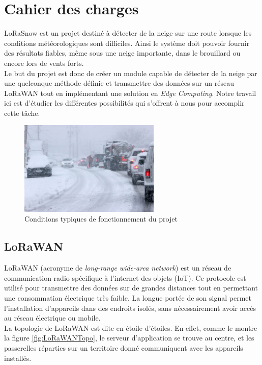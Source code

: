 \section{Cahier des charges}

LoRaSnow est un projet destiné à détecter de la neige sur une route lorsque les conditions 
météorologiques sont difficiles. Ainsi le système doit pouvoir fournir des résultats fiables,
même sous une neige importante, dans le brouillard ou encore lors de vents forts.\\
Le but du projet est donc de créer un module capable de détecter de la neige par une quelconque méthode 
définie et transmettre des données sur un réseau LoRaWAN tout en implémentant une solution en 
\emph{Edge Computing}. Notre travail ici est d'étudier les différentes possibilités qui s'offrent à nous 
pour accomplir cette tâche.

\begin{figure}[H]
    \centering
    \includegraphics[width=0.6\textwidth]{Images/Illustration/ConditionDifficiles.jpg}
    \caption[]{Conditions typiques de fonctionnement du projet\footnotemark[1]}
    \label{fig:ConditionDifficiles}
\end{figure}


\newpage

\subsection{LoRaWAN}
LoRaWAN (acronyme de \emph{long-range wide-area network}) est un réseau de communication radio spécifique
à l'internet des objets (IoT). Ce protocole est utilisé pour transmettre des données sur de grandes 
distances tout en permettant une consommation électrique très faible. La longue portée de son signal 
permet l'installation d'appareils dans des endroits isolés, sans nécessairement avoir accès au réseau 
électrique ou mobile.\\
La topologie de LoRaWAN est dite en étoile d'étoiles. En effet, comme le montre la figure \ref{fig:LoRaWANTopo},
le serveur d'application se trouve au centre, et les passerelles réparties sur un territoire donné 
communiquent avec les appareils installés.

